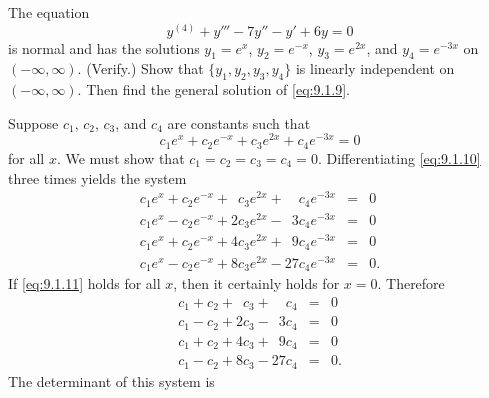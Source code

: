 \setcounter{example}{1}
\setcounter{equation}{8}
\begin{example}
  \label{example:9.1.2}\rm The equation
  \begin{equation}
    \label{eq:9.1.9}y^{(4)}+y'''-7y''-y'+6y=0
  \end{equation}
  is normal and has the solutions $y_{1}=e^{x}$, $y_{2}=e^{-x}$, $y_{3}=e^{2x}$, and $y_{4}=e^{-3x}$
  on $(-\infty,\infty)$. (Verify.) Show that $\{y_{1},y_{2},y_{3},y_{4}\}$ is linearly independent
  on $(-\infty,\infty)$. Then find the general solution of \eqref{eq:9.1.9}.
\end{example}
\setcounter{equation}{9}
\begin{examplesolution}
\solution Suppose $c_{1}$, $c_{2}$, $c_{3}$, and $c_{4}$ are constants such that
\begin{equation}
  \label{eq:9.1.10}c_{1}e^{x}+c_{2}e^{-x}+c_{3}e^{2x}+c_{4}e^{-3x}=0
\end{equation}
for all $x$. We must show that $c_{1}=c_{2}=c_{3}=c_{4}=0$. Differentiating \eqref{eq:9.1.10} three
times yields the system
\begin{equation}
  \label{eq:9.1.11}
  \begin{array}{rcl}
    c_{1}e^{x}+c_{2}e^{-x}+\phantom{2}c_{3}e^{2x}+\phantom{27}c_{4}e^{-3x} & = & 0  \\
    c_{1}e^{x}-c_{2}e^{-x}+2c_{3}e^{2x}-\phantom{2}3c_{4}e^{-3x}           & = & 0  \\
    c_{1}e^{x}+c_{2}e^{-x}+4c_{3}e^{2x}+\phantom{2}9c_{4}e^{-3x}           & = & 0  \\
    c_{1}e^{x}-c_{2}e^{-x}+8c_{3}e^{2x}-27c_{4}e^{-3x}                     & = & 0.
  \end{array}
\end{equation}
If \eqref{eq:9.1.11} holds for all $x$, then it certainly holds for $x=0$. Therefore
\[
  \begin{array}{rcl}
    c_{1}+c_{2}+\phantom{2}c_{3}+\phantom{27}c_{4} & = & 0  \\
    c_{1}-c_{2}+2c_{3}-\phantom{2}3c_{4}           & = & 0  \\
    c_{1}+c_{2}+4c_{3}+\phantom{2}9c_{4}           & = & 0  \\
    c_{1}-c_{2}+8c_{3}-27c_{4}                     & = & 0.
  \end{array}
\]
The determinant of this system is
\begin{equation}
  \label{eq:9.1.12}
  \begin{array}{rcl}

\end{array}
\end{equation}
\end{examplesolution}
